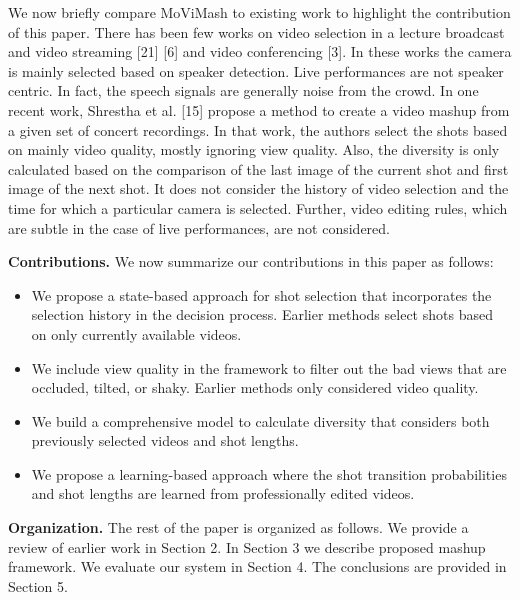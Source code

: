 \documentclass{sig-alternate}
\begin{document}
We now briefly compare MoViMash to existing work to highlight
the contribution of this paper. There has been few works on
video selection in a lecture broadcast and video streaming [21] [6]
and video conferencing [3]. In these works the camera is mainly
selected based on speaker detection. Live performances are not
speaker centric. In fact, the speech signals are generally noise from
the crowd. In one recent work, Shrestha et al. [15] propose a
method to create a video mashup from a given set of concert recordings.
In that work, the authors select the shots based on mainly
video quality, mostly ignoring view quality. Also, the diversity is
only calculated based on the comparison of the last image of the
current shot and first image of the next shot. It does not consider
the history of video selection and the time for which a particular
camera is selected. Further, video editing rules, which are subtle in
the case of live performances, are not considered.

\textbf{Contributions. }We now summarize our contributions in this paper
as follows:

\begin{itemize}
\item We propose a state-based approach for shot selection that incorporates
the selection history in the decision process. Earlier
methods select shots based on only currently available
videos.
\item We include view quality in the framework to filter out the
bad views that are occluded, tilted, or shaky. Earlier methods
only considered video quality.
\item  We build a comprehensive model to calculate diversity that
considers both previously selected videos and shot lengths.
\item We propose a learning-based approach where the shot transition
probabilities and shot lengths are learned from professionally
edited videos.
\end{itemize}
\textbf{Organization. }The rest of the paper is organized as follows.
We provide a review of earlier work in Section 2. In Section 3 we
describe proposed mashup framework. We evaluate our system in
Section 4. The conclusions are provided in Section 5.
\end{document}
